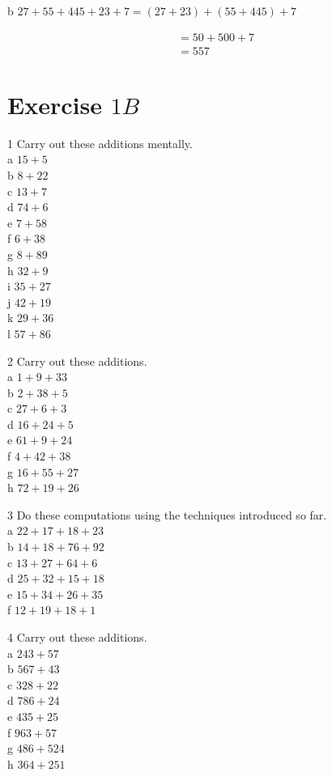 \documentclass[10pt]{article}
\begin{document}
b \(27+55+445+23+7=(27+23)+(55+445)+7\)

\[
\begin{aligned}
& =50+500+7 \\
& =557
\end{aligned}
\]

\section*{Exercise \(1 B\)}
1 Carry out these additions mentally.\\
a \(15+5\)\\
b \(8+22\)\\
c \(13+7\)\\
d \(74+6\)\\
e \(7+58\)\\
f \(6+38\)\\
g \(8+89\)\\
h \(32+9\)\\
i \(35+27\)\\
j \(42+19\)\\
k \(29+36\)\\
l \(57+86\)

2 Carry out these additions.\\
a \(1+9+33\)\\
b \(2+38+5\)\\
c \(27+6+3\)\\
d \(16+24+5\)\\
e \(61+9+24\)\\
f \(4+42+38\)\\
g \(16+55+27\)\\
h \(72+19+26\)

3 Do these computations using the techniques introduced so far.\\
a \(22+17+18+23\)\\
b \(14+18+76+92\)\\
c \(13+27+64+6\)\\
d \(25+32+15+18\)\\
e \(15+34+26+35\)\\
f \(12+19+18+1\)

4 Carry out these additions.\\
a \(243+57\)\\
b \(567+43\)\\
c \(328+22\)\\
d \(786+24\)\\
e \(435+25\)\\
f \(963+57\)\\
g \(486+524\)\\
h \(364+251\)
\end{document}
